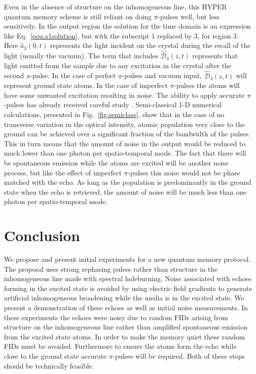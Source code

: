                                                                                                                                                                                                                                                                                                                                                                                                                                                                                                                                                                                                                                                                                                                                                                                                                                                                                                                                                                                                                                                                                                                                                                                                                                                                                                                                                                                                                                                                                                                                                                                                                                                                                                                                                                                                                                                                                                                                                                                                                                                                                                                                                                                                                                                                                                                                                                                                                                                                                                                                                                                                                                                                                                                                                                                                                                                                                                                                                                                                                                                                                                                                                                                                                                                                                                                                                                                                                                                                                                                                                                                                                                                                                                                                                                                                                                                                                                                                                                                                                                                                                                                                                                                                                                                                                                                                                                                                                                                                                                                                                                                                                                                                                                                                                                                                                                                                                                                                                                                                                                                                                                                                                                                                                                                                                                                                                                                                                                                                                                                                                                                                                                                                                                                                                                                                                                                                                                                                                                                                                                                                                                                                                                                                                                                                                                                                                                                                                                                                                                                                                                                                                                                                                                                                                                                                                                                                                                                                                                                                                                                                                                                                                                                                                                                                                                                                                                                                                                                                                                                                                                                                                                                                                                                                                                                                                                                                                                                                                                                                                                                                                                                                                                                                                                                                                                                                                                                                                                                                                                                                                                                                                                                                                                                                                                                                                                                                                                                                                                                                                                                                                                                                                                                                                                                                                                                                                                                                                                                                                                                                                                                                                                                                                                                                                                                                                                                                                                                                                                                                                                                                                                                                                                                                                                                                                                                                                                                                                                                                                                                                                                                                                                                                                                                                                                                                                                                                                                                                                                                                                                                                                                                                                                                                                                                                                                                                                                                                                                                                                                                                                                                                                                                                                                                                                                                                                                                                                                                                                                                                                                                                                                                                                                                                                                                                                                                                                                                                                                                                                                                                                                                                                                                                                                                                                                                                                                                                                                                                                                                                                                                                                                                                                                                                                                                                                                                                                                                                                                                                                                                                                                                                                                                                                                                                                                                                                                                                                                                                                                                                                                                                                                                                                                                                                                                                                                                                                                                                                                                                                                                                                                                                                                                                                                                                                                                                                                                                                                                                                                                                                                                                                                                                                                                                                                                                                                                                                                                                                                                                                                                                                                                                                                                                                                                                                                                                                                                                                                                                                                                                                                                                                                                                                                                                                                                                                                                                                                                                                                                                                                                                                                                                                                                                                                                                                                                                                                                                                                                                                                                                                                                                                                                                                                                                                                                                                                                                                                                                                                                                                                                                                                                                                                                                                                                                                                                                                                                                                                                                                                                                                                                                                                                                                                                                                                                                                                                                                                                                                                                                                                                                                                                                                                                                                                                                                                                                                                                                                                                                                                                                                                                                                                                                                                                                                                                                                                                                                                                                                                                                                                                                                                                                                                                                                                                                                                                                                                                                                                                                                                                                                                                                                                                                                                                                                                                                                                                                                                                                                                                                                                                                                                                                                                                                                                                                                                                                                                                                                                                                                                                                                                                                                                                                                                                                                                                                                                                                                                                                                                                                                                                                                                                                                                                                                                                                                                                                                                                                                                                                                                                                                                                                                                                                                                                                                                                                                                                                                                                                                                                                                                                                                                                                                                                                                                                                                                                                                                                                                                                                                                                                                                                                                                                                                                                                                                                                                                                                                                                                                                                                                                                                                                                                                                                                                                                                                                                                                                                                                                                                                                                                                                                                                                                                                                                                                                                                                                                                                                                                                                                                                                                                                                                                                                                                                                                                                                                                                                                                                                                                                                                                                                                                                                                                                                                                                                                                                                                                                                                                                                                                                                                                                                                                                                                                                                                                                                                                                                                                                                                                                                                                                                                                                                                                                                                                                                                                                                                                                                                                                                                                                                                                                                                                                                                                                                                                                                                                                                                                                                                                                                                                                                                                                                                                                                                                                                                                                                                                                                                                                                                                                                                                                                                                                                                                                                                                                                                                                                                                                                                                                                                                                                                                                                                                                                                                                                                                                                                                                                                                                                                                                                                                                                                                                                                                                                                                                                                                                                                                                                                                                                                                                                                                                                                                                                                                                                                                                                                                                                                                                                                                                                                                                                                                                                                                                                                                                                                                                                                                                                                                                                                                                                                                                                                                                                                                                                                                                                                                                                                                                                                                                                                                                                                                                                                                                                                                                                                                                                                                                                                                                                                                                                                                                                                                                                                                                                                                                                                                                                                                                                                                                                                                                                                                                                                                                                                                                                                                                                                                                                                                                                                                                                                                                                                                                                                                                                                                                                                                                                                                                                                                                                                                                                                                                                                                                                                                                                                                                                                                                                                                                                                                                                                                                                                                                                                                                                                                                                                                                                                                                                                                                                                                                                                                                                                                                                                                                                                                                                                                                                                                                                                                                                                                                                                                                                                                                                                                                                                                                                                                                                                                                                                                                                                                                                                                                                                                                                                                                                                                                                                                                                                                                                                                                                                                                                                                                                                                                                                                                                                                                                                                                                                                                                                                                                                                                                                                                                                                                                                                                                                                                                                                                                                                                                                                                                                                                                                                                                                                                                                                                                                                                                                                                                                                                                                                                                                                                                                                                                                                                                                                                                                                                                                                                                                                                                                                                                                                                                                                                                                                                                                                                                                                                                                                                                                                                                                                                                                                                                                                                                                                                                                                                                                                                                                                                                                                                                                                                                                                                                                                                                                                                                                                                                                                                                                                                                                                                                                                                                                                                                                                                                                                                                                                                                                                                                                                                                                                                                                                                                                                                                                                                                                                                                                                                                                                                                                                                                                                                                                                                                                                                                                                                                                                                                                                                                                                                                                                                                                                                                                                                                                                                                                                                                                                                                                                                                                                                                                                                                                                                                                                                                                                                                                                                                                                                                                                                                                                                                                                                                                                                                                                                                                                                                                                                                                                                                                                                                                                                                                                                                                                                                                                                                                                                                                                                                                                                                                                                                                                                                                                                                                                                                                                                                                                                                                                                                                                                                                                                                                                                                                                                                                                                                                                                                                                                                                                                                                                                                                                                                                                                                                                                                                                                                                                                                                                                                                                                                                                                                                                                                                                                                                                                                                                                                                                                                                                                                                                                                                                                                                                                                                                                                                                                                                                                                                                                                                                                                                                                                                                                                                                                                                                                                                                                                                                                                                                                                                                                                                                                                                                                                                                                                                                                                                                                                                                                                                                                                                                                                                                                                                                                                                                                                                                                                                                                                                                                                                                                                                                                                                                                                                                                                                                                                                                                                                                                                                                                                                                                                                                                                                                                                                                                                                                                                                                                                                                                                                                                                                                                                                                                                                                                                                                                                                                                                                                                                                                                                                                                                                                                                                                                                                                                                                                                                                                                                                                                                                                                                                                                                                                                                                                                                                                                                                                                                                                                                                                                                                                                                                                                                                                                                                                                                                                                                                                                                                                                                                                                                                                                                                                                                                                                                                                                                                                                                                                                                                                                                                                                                                                                                                                                                                                                                                                                                                                                                                                                                                                                                                                                                                                                                                                                                                                                                                                                                                                                                                                                                                                                                                                                                                                                                                                                                                                                                                                                                                                                                                                                                                                                                                                                                                                                                                                                                                                                                                                                                                                                                                                                                                                                                                                                                                    \documentclass[superscriptaddress,pra,twocolumn,showpacs,amsmath,amssymb,aps,a4paper]{revtex4}
\begin{document}
Even in the absence of structure on the inhomogeneous line, this HYPER quantum
memory scheme is still reliant on doing $\pi$-pulses well, but less
sensitively. In the output region the solution for the time domain is
an expression like Eq.~\ref{equ:a1solution}, but with the subscript 1
replaced by 3, for region 3. Here $\hat{a}_3(0,t)$ represents the
light incident on the crystal during the recall of the light (usually
the vacuum). The term that includes $\mathcal{\hat{D}}_3(z,t)$
represents that light emitted from the sample due to any excitation in
the crystal after the second $\pi$-pulse. In the case of perfect
$\pi$-pulses and vacuum input, $\hat{\mathcal{D}}_3(z,t)$ will
represent ground state atoms. In the case of imperfect $\pi$-pulses
the atoms will have some unwanted excitation resulting in noise. The
ability to apply accurate $\pi$-pulses has already received
careful study \cite{zafa07,rugg10}. Semi-classical 1-D numerical
calculations, presented in Fig.~\ref{fig:semiclass}, show that in the
case of no transverse variation in the optical intensity, atomic population very
close to the ground can be achieved over a significant fraction of the
bandwidth of the pulses. This in turn means that the amount of noise
in the output would be reduced to much lower than one photon per
spatio-temporal mode. The fact that there will be spontaneous emission while the atoms are excited will be another noise process, but like the effect of imperfect $\pi$-pulses this noise would not be phase matched with the echo. As long as the population is predominantly in the ground state when the echo is retrieved, the amount of noise will be much less than one photon per spatio-temporal mode.

\section{Conclusion}

We propose and present initial experiments for a new quantum memory
protocol. The proposal uses strong rephasing pulses rather than
structure in the inhomogeneous line made with spectral
holeburning. Noise associated with echoes forming in the excited state
is avoided by using electric field gradients to generate artificial
inhomogeneous broadening while the media is in the excited state. We
present a demonstration of these echoes as well as initial noise
measurements. In these experiments the echoes were noisy due to random
FIDs arising from structure on the inhomogeneous line rather than
amplified spontaneous emission from the excited state atoms. In order to make
the memory quiet these random FIDs must be avoided. Furthermore to ensure the atoms form the echo while close to the ground state accurate
$\pi$-pulses will be required. Both of these steps should be
technically feasible.
\end{document}
